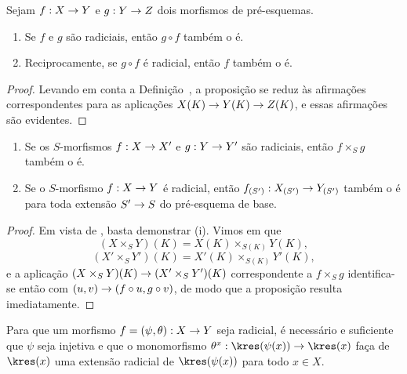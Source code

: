 \documentclass[oneside]{amsart}
\makeatletter
\newcommand{\ega@arrow}[2]{\mathchoice{#1}{#2}{#2}{#2}}
\renewcommand{\to}{\ega@arrow{\longrightarrow}{\rightarrow}}
\let\EGAOriginalLabel\label
\renewcommand{\label}[1]{\phantomsection\EGAOriginalLabel{#1}}
\makeatother
\begin{document}
\begin{proposition}[3.5.6]
\label{I.3.5.6}
Sejam $f:X\to Y$ e $g:Y\to Z$ dois morfismos de pré-esquemas.
\begin{enumerate}
  \item[{\rm(i)}] Se $f$ e $g$ são radiciais, então $g\circ f$ também o é.
  \item[{\rm(ii)}] Reciprocamente, se $g\circ f$ é radicial, então $f$
  também o é.
\end{enumerate}
\end{proposition}

\begin{proof}
Levando em conta a Definição~, a proposição se reduz às
afirmações correspondentes para as aplicações $X(K)\to Y(K)\to Z(K)$, e
essas afirmações são evidentes.
\end{proof}

\begin{proposition}[3.5.7]
\label{I.3.5.7}
\medskip\noindent
\begin{enumerate}
  \item[{\rm(i)}] Se os $S$-morfismos $f:X\to X'$ e $g:Y\to Y'$ são
  radiciais, então $f\times_S g$ também o é.
  \item[{\rm(ii)}] Se o $S$-morfismo $f:X\to Y$ é radicial, então
  $f_{(S')}:X_{(S')}\to Y_{(S')}$ também o é para toda extensão $S'\to S$
  do pré-esquema de base.
\end{enumerate}
\end{proposition}

\begin{proof}
Em vista de , basta demonstrar (i).
Vimos em  que
\[
  (X\times_S Y)(K)=X(K)\times_{S(K)}Y(K),
\]
\[
  (X'\times_S Y')(K)=X'(K)\times_{S(K)}Y'(K),
\]
e a aplicação $(X\times_S Y)(K)\to(X'\times_S Y')(K)$ correspondente a
$f\times_S g$ identifica-se então com $(u,v)\to(f\circ u,g\circ v)$, de
modo que a proposição resulta imediatamente.
\end{proof}

\begin{proposition}[3.5.8]
\label{I.3.5.8}
Para que um morfismo $f=(\psi,\theta):X\to Y$ seja radicial, é necessário
e suficiente que $\psi$ seja injetiva e que o monomorfismo
$\theta^x:\kres(\psi(x))\to\kres(x)$ faça de $\kres(x)$ uma extensão
radicial de $\kres(\psi(x))$ para todo $x\in X$.
\end{proposition}
\end{document}
